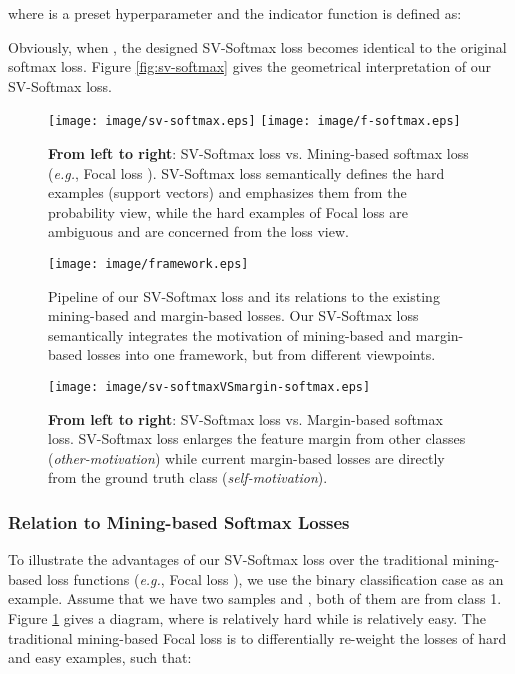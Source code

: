 \documentclass[10pt,twocolumn,letterpaper]{article}
\begin{document}
where  is a preset hyperparameter and the indicator function  is defined as:

Obviously, when , the designed SV-Softmax loss becomes identical to the original softmax loss. Figure \ref{fig:sv-softmax} gives the geometrical interpretation of our SV-Softmax loss.

\begin{figure}[t]
\begin{center}
 \texttt{[image: image/sv-softmax.eps]}
 \texttt{[image: image/f-softmax.eps]}
\end{center}
   \caption{\textbf{From left to right}: SV-Softmax loss vs. Mining-based softmax loss (\textit{e.g.}, Focal loss \cite{Focal}). SV-Softmax loss semantically defines the hard examples (support vectors) and emphasizes them from the probability view, while the hard examples of Focal loss are ambiguous and are concerned from the loss view. }
\label{fig:sv-mining}
\end{figure}

\begin{figure*}[t]
\begin{center}
   \texttt{[image: image/framework.eps]}
\end{center}
   \caption{Pipeline of our SV-Softmax loss and its relations to the existing mining-based and margin-based losses. Our SV-Softmax loss semantically integrates the motivation of mining-based and margin-based losses into one framework, but from different viewpoints.}
\label{fig:framework}
\end{figure*}

\begin{figure}[t]
\begin{center}
\texttt{[image: image/sv-softmaxVSmargin-softmax.eps]}
\end{center}
   \caption{\textbf{From left to right}: SV-Softmax loss vs. Margin-based softmax loss. SV-Softmax loss enlarges the feature margin from other classes (\textit{other-motivation}) while current margin-based losses are directly from the ground truth class (\textit{self-motivation}).}
\label{fig:sv-margin}
\end{figure}

\subsubsection{Relation to Mining-based Softmax Losses}
To illustrate the advantages of our SV-Softmax loss over the traditional mining-based loss functions (\textit{e.g.}, Focal loss \cite{Focal}), we use the binary classification case as an example. Assume that we have two samples  and , both of them are from class 1. Figure \ref{fig:sv-mining} gives a diagram, where  is relatively hard while  is relatively easy. The traditional mining-based Focal loss is to differentially re-weight the losses of hard and easy examples, such that:
\end{document}
